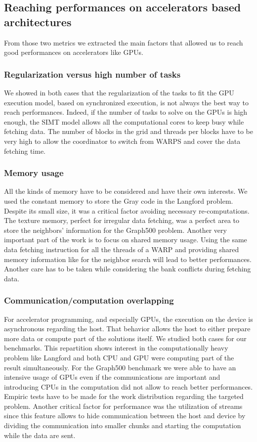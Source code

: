 \subsection{Reaching performances on accelerators based architectures}
From those two metrics we extracted the main factors that allowed us to reach good performances on accelerators like GPUs. 
\subsubsection{Regularization versus high number of tasks}
We showed in both cases that the regularization of the tasks to fit the GPU execution model, based on synchronized execution, is not always the best way to reach performances.
Indeed, if the number of tasks to solve on the GPUs is high enough, the SIMT model allows all the computational cores to keep busy while fetching data. 
The number of blocks in the grid and threads per blocks have to be very high to allow the coordinator to switch from WARPS and cover the data fetching time.
\subsubsection{Memory usage}
All the kinds of memory have to be considered and have their own interests. 
We used the constant memory to store the Gray code in the Langford problem.
Despite its small size, it was a critical factor avoiding necessary re-computations.
The texture memory, perfect for irregular data fetching, was a perfect area to store the neighbors’ information for the Graph500 problem.
Another very important part of the work is to focus on shared memory usage. 
Using the same data fetching instruction for all the threads of a WARP and providing shared memory information like for the neighbor search will lead to better performances. 
Another care has to be taken while considering the bank conflicts during fetching data. 

\subsubsection{Communication/computation overlapping}
For accelerator programming, and especially GPUs, the execution on the device is asynchronous regarding the host. 
That behavior allows the host to either prepare more data or compute part of the solutions itself. 
We studied both cases for our benchmarks. 
This repartition shows interest in the computationally heavy problem like Langford and both CPU and GPU were computing part of the result simultaneously. 
For the Graph500 benchmark we were able to have an intensive usage of GPUs even if the communications are important and introducing CPUs in the computation did not allow to reach better performances.
Empiric tests have to be made for the work distribution regarding the targeted problem. 
Another critical factor for performance was the utilization of streams since this feature allows to hide communication between the host and device by dividing the communication into smaller chunks and starting the computation while the data are sent. 

